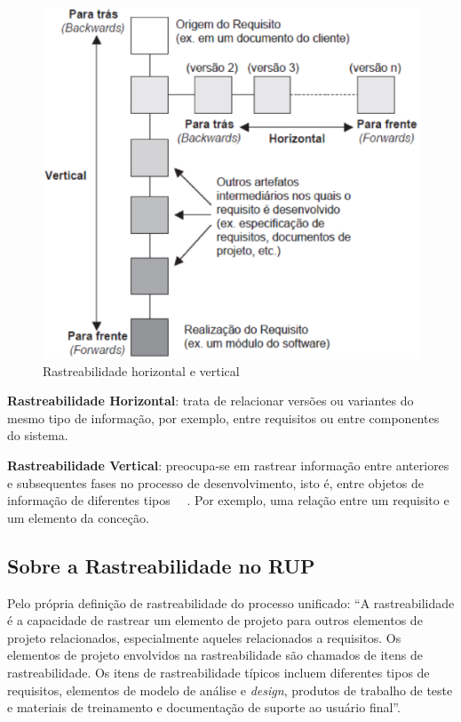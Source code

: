 \begin{figure}[htb]
\centering
  \includegraphics[keepaspectratio=true,scale=0.5]
  {figuras/rastreabilidade_horizontal.eps}
  \caption{Rastreabilidade horizontal e vertical ~\cite{genvigir}}
  \label{sideways}
\end{figure}

\clearpage{}


\textbf{Rastreabilidade Horizontal}: trata de relacionar versões ou variantes do mesmo tipo de informação, por exemplo, entre requisitos ou entre componentes do sistema. ~\cite{persson}~\cite{winkler}

\textbf{Rastreabilidade Vertical}: preocupa-se em rastrear informação entre anteriores e subsequentes fases no processo de desenvolvimento, isto é, entre objetos de informação de diferentes tipos ~\cite{persson}~\cite{winkler}. Por exemplo, uma relação entre um requisito e um elemento da conceção.~\cite{winkler}

\subsection{Sobre a Rastreabilidade no RUP}

Pelo própria definição de rastreabilidade do processo unificado: “A rastreabilidade é a capacidade de rastrear um elemento de projeto para outros elementos de projeto relacionados, especialmente aqueles relacionados a requisitos. Os elementos de projeto envolvidos na rastreabilidade são chamados de itens de rastreabilidade.  Os itens de rastreabilidade típicos incluem diferentes tipos de requisitos, elementos de modelo de análise e \textit{design}, produtos de trabalho de teste e materiais de treinamento e documentação de suporte ao usuário final”.~\cite{rup1}

